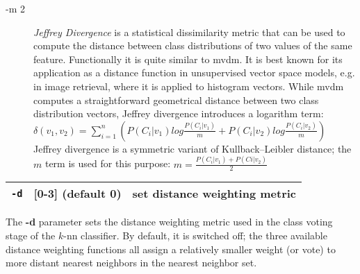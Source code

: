 \documentclass[11pt]{article}
\begin{document}
\begin{description}
\item[-m 2] {\em Jeffrey Divergence} is a statistical dissimilarity
  metric that can be used to compute the distance between class
  distributions of two values of the same feature. Functionally it is
  quite similar to {\sc mvdm}. It is best known for its application as
  a distance function in unsupervised vector space models, e.g. in
  image retrieval, where it is applied to histogram vectors. While
  {\sc mvdm} computes a straightforward geometrical distance between
  two class distribution vectors, Jeffrey divergence introduces a
  logarithm term:
\begin{math}
\delta(v_{1}, v_{2}) = \sum_{i=1}^{n} 
( P(C_{i}|v_{1}) log \frac{P(C_{i}|v_{1})}{m} +
  P(C_{i}|v_{2}) log \frac{P(C_{i}|v_{2})}{m} )
\label{jd}
\end{math}
Jeffrey divergence is a symmetric variant of Kullback--Leibler
distance; the $m$ term is used for this purpose:
\begin{math}
m = \frac{P(C_{i}|v_{1}) + P(C{i}|v_{2})}{2}
\label{jdm}
\end{math}
\end{description}

\begin{tabular}{|p{}|p{}|p{}|}
\hline
{\tt -d} & [0-3] (default 0) & set distance weighting metric \\
\hline
\end{tabular}

The {\bf -d} parameter sets the distance weighting metric used in the
class voting stage of the $k$-{\sc nn} classifier. By default, it is
switched off; the three available distance weighting functions all
assign a relatively smaller weight (or vote) to more distant nearest
neighbors in the nearest neighbor set.
\end{document}
